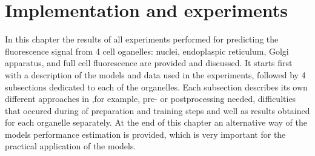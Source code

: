 \section{Implementation and experiments}
In this chapter the results of all experiments performed for predicting the fluorescence signal from 4 cell oganelles: nuclei, endoplaspic reticulum, Golgi apparatus, and full cell fluorescence are provided and discussed. It starts first with a description of the models and data used in the experiments, followed by 4 subsections dedicated to each of the organelles. Each subsection describes its own different approaches in ,for example, pre- or postprocessing needed, difficulties that occured during of preparation and training steps and well as results obtained for each organelle separately. At the end of this chapter an alternative way of the models performance estimation is provided, which is very important for the practical application of the models.

    
    \pagebreak
    
    \pagebreak
    
    \pagebreak
    
    \pagebreak
    
    \pagebreak
    